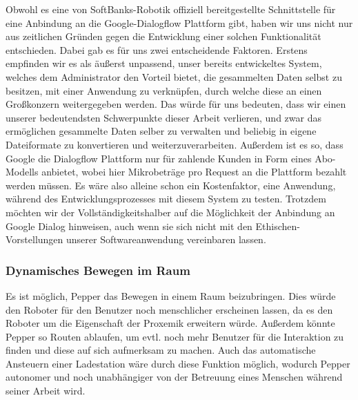 Obwohl es eine von SoftBanks-Robotik offiziell bereitgestellte Schnittstelle für eine Anbindung an die Google-Dialogflow Plattform gibt, haben wir uns nicht nur aus zeitlichen Gründen gegen die Entwicklung einer solchen Funktionalität entschieden. Dabei gab es für uns zwei entscheidende Faktoren. Erstens empfinden wir es als äußerst unpassend, unser bereits entwickeltes System, welches dem Administrator den Vorteil bietet, die gesammelten Daten selbst zu besitzen, mit einer Anwendung zu verknüpfen, durch welche diese an einen Großkonzern weitergegeben werden. Das würde für uns bedeuten, dass wir einen unserer bedeutendsten Schwerpunkte dieser Arbeit verlieren, und zwar das ermöglichen gesammelte Daten selber zu verwalten und beliebig in eigene Dateiformate zu konvertieren und weiterzuverarbeiten. Außerdem ist es so, dass Google die Dialogflow Plattform nur für zahlende Kunden in Form eines Abo-Modells anbietet, wobei hier Mikrobeträge pro Request an die Plattform bezahlt werden müssen. Es wäre also alleine schon ein Kostenfaktor, eine Anwendung, während des Entwicklungsprozesses mit diesem System zu testen. Trotzdem möchten wir der Vollständigkeitshalber auf die Möglichkeit der Anbindung an Google Dialog hinweisen, auch wenn sie sich nicht mit den Ethischen-Vorstellungen unserer Softwareanwendung vereinbaren lassen.

\subsubsection{Dynamisches Bewegen im Raum}

Es ist möglich, Pepper das Bewegen in einem Raum beizubringen. Dies würde den Roboter für den Benutzer noch menschlicher erscheinen lassen, da es den Roboter um die Eigenschaft der Proxemik erweitern würde. Außerdem könnte Pepper so Routen ablaufen, um evtl. noch mehr Benutzer für die Interaktion zu finden und diese auf sich aufmerksam zu machen. Auch das automatische Ansteuern einer Ladestation wäre durch diese Funktion möglich, wodurch Pepper autonomer und noch unabhängiger von der Betreuung eines Menschen während seiner Arbeit wird.

